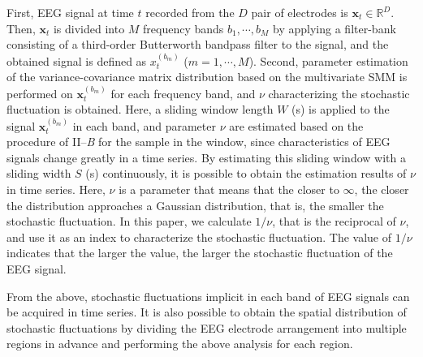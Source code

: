 \documentclass[journal]{IEEEtran}
\begin{document}
First, EEG signal at time $t$ recorded from the $D$ pair of electrodes is $\mathbf{x}_t \in \mathbb{R}^D$. Then, $\mathbf{x}_t$ is divided into $M$ frequency bands $b_1, \cdots, b_M$ by applying a filter-bank consisting of a third-order Butterworth bandpass filter to the signal, and the obtained signal is defined as $x_t^{(b_m)}$ ($m = 1,\cdots, M$).
Second, parameter estimation of the variance-covariance matrix distribution based on the multivariate SMM is performed on $\mathbf{x}^{(b_m)}_t$ for each frequency band, and $\nu$ characterizing the stochastic fluctuation is obtained.
Here, a sliding window length $W$ (s) is applied to the signal $\mathbf{x}^{(b_m)}_t$ in each band, and parameter $\nu$ are estimated based on the procedure of II--\textit{B} for the sample in the window, since characteristics of EEG signals change greatly in a time series.
By estimating this sliding window with a sliding width $S$ (s) continuously, it is possible to obtain the estimation results of $ \nu$ in time series.
Here, $\nu$ is a parameter that means that the closer to $\infty$, the closer the distribution approaches a Gaussian distribution, that is, the smaller the stochastic fluctuation.
In this paper, we calculate $1/\nu$, that is the reciprocal of $\nu$, and use it as an index to characterize the stochastic fluctuation.
The value of $1/\nu$ indicates that the larger the value, the larger the stochastic fluctuation of the EEG signal.

From the above, stochastic fluctuations implicit in each band of EEG signals can be acquired in time series.
It is also possible to obtain the spatial distribution of stochastic fluctuations by dividing the EEG electrode arrangement into multiple regions in advance and performing the above analysis for each region.

%
%
\end{document}
